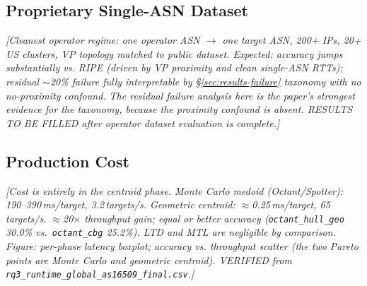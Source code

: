 \subsection{Proprietary Single-ASN Dataset}
\label{sec:results-proprietary}
\textit{[Cleanest operator regime: one operator ASN $\to$ one target ASN, 200+ IPs, 20+ US clusters,
VP topology matched to public dataset. Expected: accuracy jumps substantially vs. RIPE
(driven by VP proximity and clean single-ASN RTTs); residual $\sim$20\% failure fully
interpretable by §\ref{sec:results-failure} taxonomy with no no-proximity confound.
The residual failure analysis here is the paper's strongest evidence for the taxonomy,
because the proximity confound is absent.
RESULTS TO BE FILLED after operator dataset evaluation is complete.]}


\subsection{Production Cost}
\label{sec:results-cost}
\textit{[Cost is entirely in the centroid phase. Monte Carlo medoid (Octant/Spotter): 190--390\,ms/target,
3.2\,targets/s. Geometric centroid: $\approx$0.25\,ms/target, 65\,targets/s.
$\approx$20$\times$ throughput gain; equal or better accuracy (\texttt{octant\_hull\_geo} 30.0\%
vs.~\texttt{octant\_cbg} 25.2\%). LTD and MTL are negligible by comparison.
Figure: per-phase latency boxplot; accuracy vs. throughput scatter (the two Pareto points are
Monte Carlo and geometric centroid).
VERIFIED from \texttt{rq3\_runtime\_global\_as16509\_final.csv}.]}

